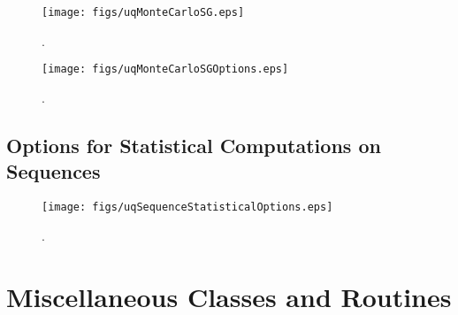 \begin{figure}[h!]
\centerline{
\texttt{[image: figs/uqMonteCarloSG.eps]}
}
\caption{
{\color{red}{The Monte Carlo sequence generator class}}.
}
\label{fig-monte-carlo-solver-class}
\end{figure}

\begin{figure}[h!]
\begin{center}
\texttt{[image: figs/uqMonteCarloSGOptions.eps]}
\end{center}
\caption{
{\color{red}{The Monte Carlo sequence generator options class}}.
}
\label{fig-monte-carlo-options-class}
\end{figure}

\clearpage
\subsection{Options for Statistical Computations on Sequences}

\begin{figure}[h!]
\centerline{
\texttt{[image: figs/uqSequenceStatisticalOptions.eps]}
}
\caption{
{\color{red}{The sequence statistical options class}}.
}
\label{fig-seq-statistical-options-class}
\end{figure}

\clearpage
\section{Miscellaneous Classes and Routines}

